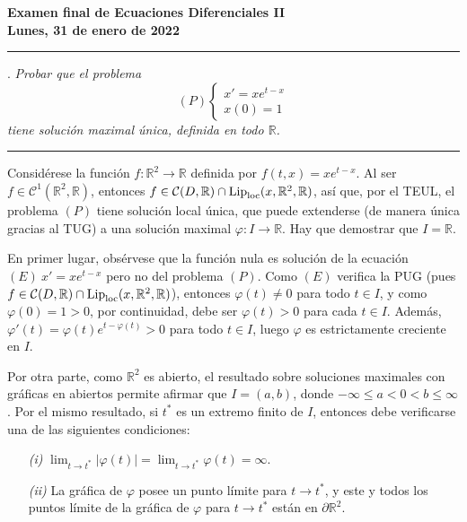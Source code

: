 \documentclass[11pt]{report}
\newcommand{\R}{\mathbb R}
\begin{document}
\begin{center}
    \textbf{Examen final de Ecuaciones Diferenciales II} \\
    \textbf{Lunes, 31 de enero de 2022}
\end{center}

\hrule

\vspace{4mm}

. \textit{Probar que el problema}
\[(P) \begin{cases}
    x'=xe^{t-x}\\
    x(0)=1
\end{cases}\]
\textit{tiene solución maximal única, definida en todo $\R$.}

\vspace{4mm}

\hrule

\vspace{4mm}

Considérese la función $f \colon \R^2 \to \R$ definida por $f(t,x)=xe^{t-x}$. Al ser $f \in \mathcal{C}^1(\R^2,\R)$, entonces $f \in \mathcal{C}(D,\R) \cap \textup{Lip}_{\textup{loc}}(x,\R^2,\R)$, así que, por el TEUL, el problema $(P)$ tiene solución local única, que puede extenderse (de manera única gracias al TUG) a una solución maximal $\varphi \colon I \to \R$. Hay que demostrar que $I=\R$.

\vspace{2mm}

En primer lugar, obsérvese que la función nula es solución de la ecuación $(E) \ x'=xe^{t-x}$ pero no del problema $(P)$. Como $(E)$ verifica la PUG (pues $f \in \mathcal{C}(D,\R) \cap \textup{Lip}_{\textup{loc}}(x,\R^2,\R)$), entonces $\varphi(t) \neq 0$ para todo $t \in I$, y como $\varphi(0)=1>0$, por continuidad, debe ser $\varphi(t)>0$ para cada $t \in I$. Además, $\varphi'(t)=\varphi(t)e^{t-\varphi(t)}>0$ para todo $t \in I$, luego $\varphi$ es estrictamente creciente en $I$.

\vspace{2mm}

Por otra parte, como $\R^2$ es abierto, el resultado sobre soluciones maximales con gráficas en abiertos permite afirmar que $I=(a,b)$, donde $-\infty \leq a < 0<b\leq \infty$. Por el mismo resultado, si $t^*$ es un extremo finito de $I$, entonces debe verificarse una de las siguientes condiciones:
\begin{itemize}
    \item[\textit{(i)}] $\displaystyle \lim_{t\to t^*} |\varphi(t)| = \lim_{t \to t^*}\varphi(t)= \infty$.
    \item[\textit{(ii)}] La gráfica de $\varphi$ posee un punto límite para $t \to t^*$, y este y todos los puntos límite de la gráfica de $\varphi$ para $t \to t^*$ están en $\partial \R^2$.
\end{itemize}
\end{document}
